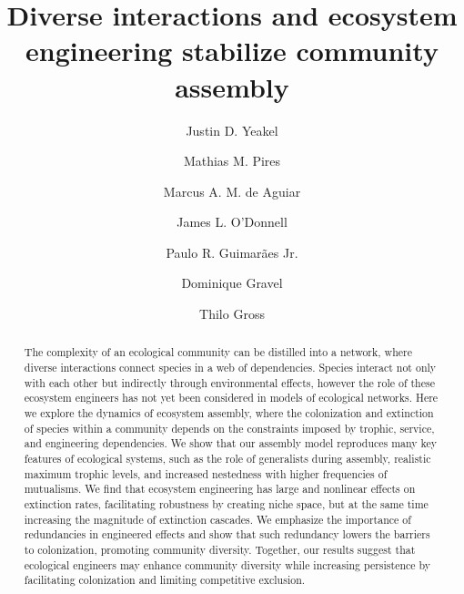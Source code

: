 \documentclass[twocolumn,preprintnumbers,amsmath,amssymb,superscriptaddress,linenumbers]{revtex4-1}
\begin{document}
\title{Diverse interactions and ecosystem engineering stabilize community assembly} %



\author{Justin D. Yeakel}  

\author{Mathias M. Pires} 

\author{Marcus A. M. de Aguiar} 

\author{James L. O'Donnell} 

\author{Paulo R. Guimar\~aes Jr.} 

\author{Dominique Gravel} 

\author{Thilo Gross} 

\begin{abstract}
  The complexity of an ecological community can be distilled into a network, where diverse interactions connect species in a web of dependencies. Species interact not only with each other but indirectly through environmental effects, however the role of these ecosystem engineers has not yet been considered in models of ecological networks. Here we explore the dynamics of ecosystem assembly, where the colonization and extinction of species within a community depends on the constraints imposed by trophic, service, and engineering dependencies. We show that our assembly model reproduces many key features of ecological systems, such as the role of generalists during assembly, realistic maximum trophic levels, and increased nestedness with higher frequencies of mutualisms. We find that ecosystem engineering has large and nonlinear effects on extinction rates, facilitating robustness by creating niche space, but at the same time increasing the magnitude of extinction cascades. We emphasize the importance of redundancies in engineered effects and show that such redundancy lowers the barriers to colonization, promoting community diversity. Together, our results suggest that ecological engineers may enhance community diversity while increasing persistence by facilitating colonization and limiting competitive exclusion. 
\end{abstract}
\end{document}

